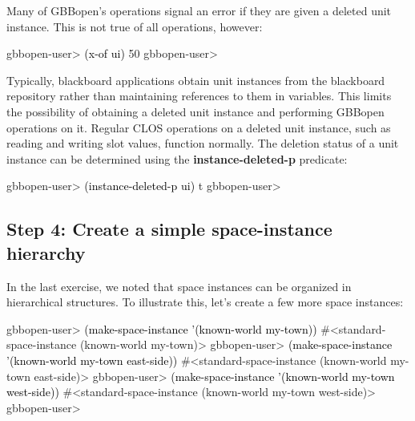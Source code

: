 \documentclass[10pt,twoside,english,pdftex]{article}
\begin{document}
Many of GBBopen's operations signal an error if they are given a deleted unit
instance.  This is not true of all operations, however:
%
\W\supp
\begin{example}
\textcolor{darkergray}{%
  gbbopen-user> \textcolor{black}{(x-of ui)}
  50
  gbbopen-user>}
\end{example}

%
Typically, blackboard applications obtain unit instances from the blackboard
repository rather than maintaining references to them in variables.  This
limits the possibility of obtaining a deleted unit instance and performing
GBBopen operations on it.  Regular CLOS operations on a deleted unit instance,
such as reading and writing slot values, function normally.  The deletion
status of a unit instance can be determined using the
\textbf{instance-deleted-p} predicate:
%
\W\supp
\begin{example}
\textcolor{darkergray}{%
  gbbopen-user> \textcolor{black}{(instance-deleted-p ui)}
  t
  gbbopen-user>}
\end{example}

\subsection*{Step 4: Create a simple space-instance hierarchy}

%
%
In the last exercise, we noted that space instances can be organized in
hierarchical structures.  To illustrate this, let's create a few more space
instances:
%
\W\supp
\begin{example}
\textcolor{darkergray}{%
  gbbopen-user> \textcolor{black}{(make-space-instance '(known-world my-town))}
  #<standard-space-instance (known-world my-town)>
  gbbopen-user> \textcolor{black}{(make-space-instance '(known-world my-town east-side))}
  #<standard-space-instance (known-world my-town east-side)>
  gbbopen-user> \textcolor{black}{(make-space-instance '(known-world my-town west-side))}
  #<standard-space-instance (known-world my-town west-side)>
  gbbopen-user>}
\end{example}
\end{document}

